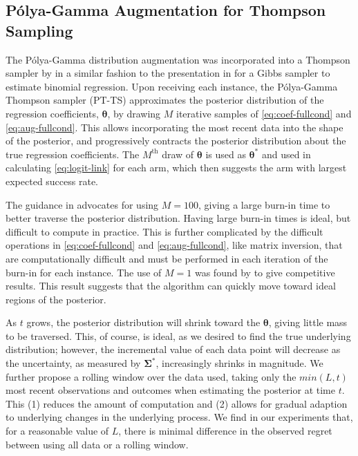 \documentclass[12pt]{article}
\begin{document}
\subsection{P\'olya-Gamma Augmentation for Thompson Sampling}

The P\'olya-Gamma distribution augmentation was incorporated into a Thompson 
sampler by \cite{dumitrascu2018pg} in a similar fashion to the presentation in 
\cite{polson2013bayesian} for a Gibbs sampler to estimate binomial regression. 
Upon receiving each instance, the P\'olya-Gamma Thompson sampler (PT-TS)
approximates the posterior distribution of the regression coefficients, 
$\bm{\theta}$, by drawing $M$ iterative samples of \eqref{eq:coef-fullcond} and
\eqref{eq:aug-fullcond}.
This allows incorporating the most recent data into the shape of the posterior,
and progressively contracts the posterior distribution about the true regression
coefficients.
The $M^{\text{th}}$ draw of $\bm{\theta}$ is used as $\bm{\theta}^*$ and used
in calculating \eqref{eq:logit-link} for each arm, which then suggests the arm 
with largest expected success rate.  

The guidance in \cite{dumitrascu2018pg} advocates for using $M = 100$, giving a 
large burn-in time to better traverse the posterior distribution.
Having large burn-in times is ideal, but difficult to compute in practice.
This is further complicated by the difficult operations in \eqref{eq:coef-fullcond}
and \eqref{eq:aug-fullcond}, like matrix inversion, that are computationally 
difficult and must be performed in each iteration of the burn-in for each instance.
The use of $M = 1$ was found by \cite{dumitrascu2018pg} to give competitive results.
This result suggests that the algorithm can quickly move toward ideal regions of
the posterior.

As $t$ grows, the posterior distribution will shrink toward the $\bm{\theta}$, 
giving little mass to be traversed. 
This, of course, is ideal, as we desired to find the true underlying distribution;
however, the incremental value of each data point will decrease as the uncertainty,
as measured by $\bm{\Sigma}^*$, increasingly shrinks in magnitude.
We further propose a rolling window over the data used, taking only the $min(L,t)$ 
most recent observations and outcomes when estimating the posterior at time $t$.
This (1) reduces the amount of computation and (2) allows for gradual adaption to 
underlying changes in the underlying process.
We find in our experiments that, for a reasonable value of $L$, there is minimal 
difference in the observed regret between using all data or a rolling window.
\end{document}
